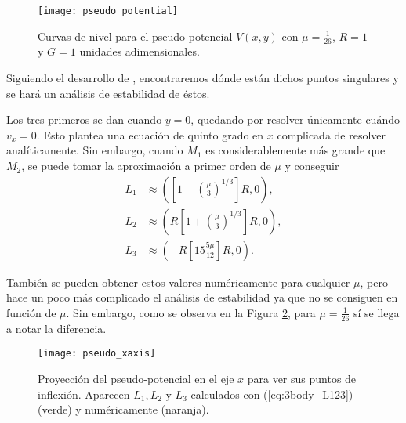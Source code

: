 \begin{figure}[h!]
 \centering
 \texttt{[image: pseudo\_potential]}
 \caption{Curvas de nivel para el pseudo-potencial $V(x,y)$ con $\mu = \frac{1}{26}$, $R=1$ y $G=1$ unidades adimensionales.}
 \label{fig:3body_pseudo_potential}
\end{figure}

Siguiendo el desarrollo de \cite{Cornish1998, Widnall2008}, encontraremos dónde están dichos puntos singulares y se hará un análisis de estabilidad de éstos.

Los tres primeros se dan cuando $y=0$, quedando por resolver únicamente cuándo $\dot{v}_x = 0$. Esto plantea una ecuación de quinto grado en $x$ complicada de resolver analíticamente. Sin embargo, cuando $M_1$ es considerablemente más grande que $M_2$, se puede tomar la aproximación a primer orden de $\mu$ y conseguir
\begin{align}
 L_1 &\approx \left( \left[ 1 - \left(\frac{\mu}{3}\right)^{1/3} \right] R , 0 \right) \nonumber, \\ 
 L_2 &\approx \left( R\left[ 1 + \left(\frac{\mu}{3}\right)^{1/3} \right] R , 0 \right) \nonumber, \\
 L_3 &\approx \left( -R\left[ 1 5 \frac{5 \mu}{12} \right] R, 0 \right).
 \label{eq:3body_L123}
\end{align} 

También se pueden obtener estos valores numéricamente para cualquier $\mu$, pero hace un poco más complicado el análisis de estabilidad ya que no se consiguen en función de $\mu$. Sin embargo, como se observa en la Figura \ref{fig:3body_pseudo_xaxis}, para $\mu = \frac{1}{26}$ sí se llega a notar la diferencia.

\begin{figure}[h!]
 \centering
 \texttt{[image: pseudo\_xaxis]}
 \caption{Proyección del pseudo-potencial en el eje $x$ para ver sus puntos de inflexión. Aparecen $L_1, L_2$ y $L_3$ calculados con (\ref{eq:3body_L123}) (verde) y numéricamente (naranja).}
 \label{fig:3body_pseudo_xaxis}
\end{figure}

